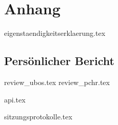 \part{Anhang}

{eigenstaendigkeitserklaerung.tex}

\chapter{Persönlicher Bericht}
{review_ubos.tex}
{review_pchr.tex}

{api.tex}

{sitzungsprotokolle.tex}

